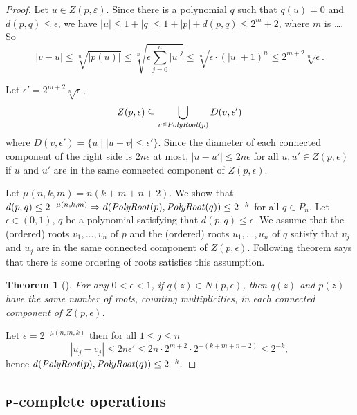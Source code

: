 \documentclass{article}
\newtheorem{theorem}{Theorem}[section]
\theoremstyle{definition}
\theoremstyle{remark}
\begin{document}
\begin{proof}
Let $u \in Z (p, \varepsilon)$. 
Since there is a polynomial $q$ such that $q(u)=0$ and $d(p, q) \le \epsilon$,
we have $|u| \le 1+|q| \le 1 + |p| + d(p, q) \le 2^m + 2$, 
where $m$ is \ldots. %
So
\begin{equation}
 |v - u|
 \le
 \sqrt[n]{|p(u)|}
 \le
 \sqrt[n]{\epsilon \sum_{j=0}^n |u|^j}
 \le
 \sqrt[n]{\epsilon \cdot (|u|+1)^n}
 \le
 2^{m+2} \sqrt[n]{\epsilon}.
\end{equation}


Let $\epsilon' = 2^{m+2} \sqrt[n]{\epsilon}$,
\begin{equation}
 Z(p, \epsilon) \subseteq \bigcup_{v \in \mathit{PolyRoot}(p)} D(v, \epsilon')
\end{equation}
where $D(v, \epsilon') = \{u \mid |u - v| \le \epsilon'\}$.
Since the diameter of each connected component of the right side 
is $2n\epsilon$ at most, $|u - u'| \le 2n\epsilon$ for all 
$u, u' \in Z(p, \epsilon)$ if $u$ and $u'$ are in the same connected component
of $Z(p, \epsilon)$.

Let $\mu(n, k, m) = n(k+m+n+2)$.
We show that 
$
d(p, q) \le 2^{-\mu(n, k, m)} \Rightarrow d(\mathit{PolyRoot}(p), \mathit{PolyRoot}(q)) \le 2^{-k}
$
for all $q \in P_n$.
Let $\epsilon \in (0,1)$, $q$ be a polynomial satisfying that
 $d(p, q) \le \epsilon$.
We assume that the (ordered) roots $v_1, \dots, v_n$ of $p$
and the (ordered) roots $u_1, \dots, u_n$ of $q$ satisfy that
$v_j$ and $u_j$ are in the same connected component of $Z(p, \epsilon)$.
Following theorem says that there is some ordering of roots satisfies this assumption.
\begin{theorem}
[\cite{mosier1986root}]
\label{theorem: root neighborhoods 2}
 For any $0 < \epsilon < 1$, if $q(z) \in N(p, \epsilon)$,
 then $q(z)$ and $p(z)$ have the same number of roots,
 counting multiplicities, in each connected component of $Z(p, \epsilon)$.
\end{theorem}
Let $\epsilon = 2^{-\mu(n,m,k)}$ then for all $1 \le j \le n$
\begin{equation}
 |u_j - v_j| 
 \le
 2n\epsilon'
 \le
 2n \cdot 2^{m+2} \cdot 2^{-(k+m+n+2)} 
 \le
 2^{-k},
\end{equation}
hence
$
 d(\mathit{PolyRoot}(p), \mathit{PolyRoot}(q)) \le 2^{-k}.
$
\end{proof}

\subsection{\texorpdfstring{$\text{\bfseries \sffamily \upshape P}$}{P}-complete operations}
\label{section:P-complete}
\end{document}
